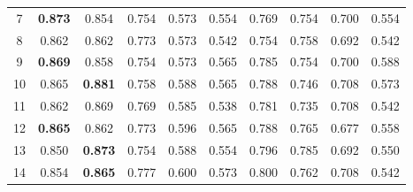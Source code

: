 \begin{table}[]
\begin{tabular}{|c|ccccccccc|}
7    & \textbf{0.873}                   & 0.854                        & 0.754                              & 0.573                             & 0.554                    & 0.769                             & 0.754                             & 0.700                            & 0.554                       \\ \cline{1-1}
8    & 0.862                            & 0.862                        & 0.773                              & 0.573                             & 0.542                    & 0.754                             & 0.758                             & 0.692                            & 0.542                       \\ \cline{1-1}
9    & \textbf{0.869}                   & 0.858                        & 0.754                              & 0.573                             & 0.565                    & 0.785                             & 0.754                             & 0.700                            & 0.588                       \\ \cline{1-1}
10   & 0.865                            & \textbf{0.881}               & 0.758                              & 0.588                             & 0.565                    & 0.788                             & 0.746                             & 0.708                            & 0.573                       \\ \cline{1-1}
11   & 0.862                            & 0.869                        & 0.769                              & 0.585                             & 0.538                    & 0.781                             & 0.735                             & 0.708                            & 0.542                       \\ \cline{1-1}
12   & \textbf{0.865}                   & 0.862                        & 0.773                              & 0.596                             & 0.565                    & 0.788                             & 0.765                             & 0.677                            & 0.558                       \\ \hline
13   & 0.850                            & \textbf{0.873}               & 0.754                              & 0.588                             & 0.554                    & 0.796                             & 0.785                             & 0.692                            & 0.550                       \\ \cline{1-1}
14   & 0.854                            & \textbf{0.865}               & 0.777                              & 0.600                             & 0.573                    & 0.800                             & 0.762                             & 0.708                            & 0.542                       \\ \cline{1-1}

\end{tabular}
\end{table}
